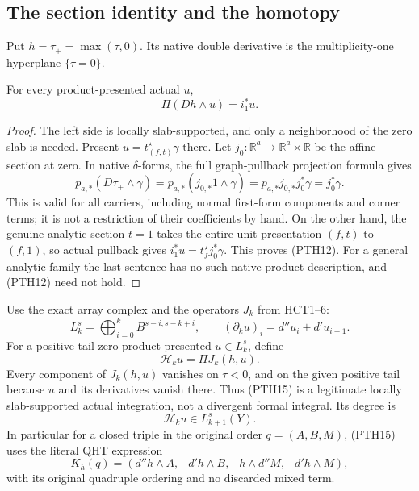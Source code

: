 \subsection{The section identity and the homotopy}

Put $h=\tau_+=\max(\tau,0)$.  Its native double derivative is
the multiplicity-one hyperplane $\{\tau=0\}$.

\begin{lemma}
For every product-presented actual $u$,
\[
                             \Pi(Dh\wedge u)=i_1^*u.
 \tag{PTH12}
\]
\end{lemma}

\begin{proof}
The left side is locally slab-supported, and only a neighborhood
of the zero slab is needed.  Present $u=t_{(f,t)}^\star\gamma$
there.  Let $j_0:\mathbb R^a\to\mathbb R^a\times\mathbb R$
be the affine section at zero.  In native $\delta$-forms,
the full graph-pullback projection formula gives
\[
 p_{a,*}(D\tau_+\wedge\gamma)
       =p_{a,*}(j_{0,*}1\wedge\gamma)
       =p_{a,*}j_{0,*}j_0^*\gamma=j_0^*\gamma.
 \tag{PTH13}
\]
This is valid for all carriers, including normal first-form
components and corner terms; it is not a restriction of their
coefficients by hand.  On the other hand, the genuine analytic
section $t=1$ takes the entire unit presentation $(f,t)$ to
$(f,1)$, so actual pullback gives
$i_1^*u=t_f^\star j_0^*\gamma$.  This proves (PTH12).
For a general analytic family the last sentence has no such
native product description, and (PTH12) need not hold.
\end{proof}

Use the exact array complex and the operators $J_k$ from HCT1--6:
\[
 L_k^s=\bigoplus_{i=0}^k B^{s-i,s-k+i},\qquad
 (\partial_k u)_i=d''u_i+d'u_{i+1}.
 \tag{PTH14}
\]
For a positive-tail-zero product-presented $u\in L_k^s$, define
\[
                         \mathcal H_k u=\Pi J_k(h,u).
 \tag{PTH15}
\]
Every component of $J_k(h,u)$ vanishes on $\tau<0$, and on
the given positive tail because $u$ and its derivatives vanish
there.  Thus (PTH15) is a legitimate locally slab-supported
actual integration, not a divergent formal integral.  Its
degree is
\[
                        \mathcal H_k u\in L_{k+1}^s(Y).
 \tag{PTH16}
\]
In particular for a closed triple in the original order
$q=(A,B,M)$, (PTH15) uses the literal QHT expression
\[
             K_h(q)=(d''h\wedge A,-d'h\wedge B,
                         -h\wedge d''M,-d'h\wedge M),
 \tag{PTH17}
\]
with its original quadruple ordering and no discarded mixed term.

